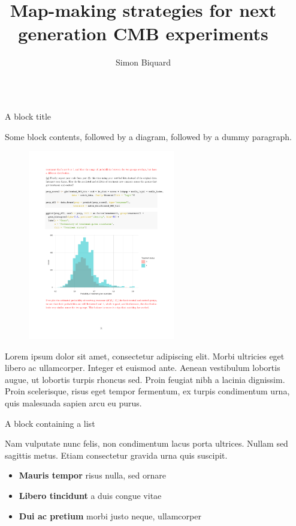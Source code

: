 \documentclass[final]{beamer}
\title{Map-making strategies for next generation CMB experiments}
\author{Simon Biquard}
\institute[shortinst]{AstroParticule et Cosmologie, Paris, France}
\newlength{\sepwidth}
\newlength{\colwidth}
\newcommand{\separatorcolumn}{\begin{column}{\sepwidth}\end{column}}
\begin{document}
\begin{frame}[t]
  \begin{columns}[t]
    \separatorcolumn

    \begin{column}{\colwidth}

      \begin{block}{A block title}

        Some block contents, followed by a diagram, followed by a dummy paragraph.

        \begin{figure}
          \centering
          \includegraphics[width=0.6\textwidth]{figures/results_fig.pdf}
        \end{figure}

        Lorem ipsum dolor sit amet, consectetur adipiscing elit. Morbi ultricies
        eget libero ac ullamcorper. Integer et euismod ante. Aenean vestibulum
        lobortis augue, ut lobortis turpis rhoncus sed. Proin feugiat nibh a
        lacinia dignissim. Proin scelerisque, risus eget tempor fermentum, ex
        turpis condimentum urna, quis malesuada sapien arcu eu purus.

      \end{block}

      \begin{block}{A block containing a list}

        Nam vulputate nunc felis, non condimentum lacus porta ultrices. Nullam sed
        sagittis metus. Etiam consectetur gravida urna quis suscipit.

        \begin{itemize}
          \item \textbf{Mauris tempor} risus nulla, sed ornare
          \item \textbf{Libero tincidunt} a duis congue vitae
          \item \textbf{Dui ac pretium} morbi justo neque, ullamcorper
        \end{itemize}


\end{block}
\end{column}
\end{columns}
\end{frame}
\end{document}
